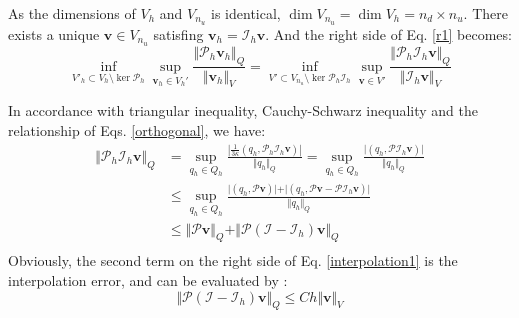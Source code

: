 \begin{pf}
    As the dimensions of $V_h$ and $V_{n_u}$ is identical, $\dim V_{n_u}=\dim V_h = n_d\times n_u$. There exists a unique $\boldsymbol v \in V_{n_u}$ satisfing $\boldsymbol v_h = \mathcal I_h \boldsymbol v$. And the right side of Eq. \eqref{r1} becomes:
\begin{equation}\label{r21}
\inf_{V'_h \subset V_h\setminus \ker \mathcal P_h}\sup_{\boldsymbol v_h \in V_h'} \frac{\Vert \mathcal P_h \boldsymbol v_h \Vert_Q}{\Vert \boldsymbol v_h \Vert_V} = 
\inf_{V'\subset V_{n_u}\setminus \ker \mathcal P_h \mathcal I_h}\sup_{\boldsymbol v \in V'} \frac{\Vert \mathcal P_h \mathcal I_h \boldsymbol v \Vert_Q}{\Vert \mathcal I_h \boldsymbol v \Vert_V}
\end{equation}

In accordance with triangular inequality, Cauchy-Schwarz inequality and the relationship of Eqs. \eqref{orthogonal}, we have:
\begin{equation}\label{interpolation1}
\begin{aligned}
    \Vert \mathcal P_h \mathcal I_h \boldsymbol v \Vert_Q &= 
    \sup_{q_h \in Q_h} \frac{\left \vert \frac{1}{3\kappa}(q_h, \mathcal P_h \mathcal I_h \boldsymbol v) \right \vert}{\Vert q_h \Vert_Q}
    =\sup_{q_h \in Q_h} \frac{\vert (q_h, \mathcal P \mathcal I_h \boldsymbol v) \vert}{\Vert q_h \Vert_Q} 
    \\
    &\le \sup_{q_h \in Q_h} \frac{\vert (q_h, \mathcal P \boldsymbol v)\vert + \vert (q_h, \mathcal P \boldsymbol v - \mathcal P \mathcal I_h \boldsymbol v) \vert}{\Vert q_h \Vert_Q} 
    \\
    &\le \Vert \mathcal P \boldsymbol v \Vert_Q
    + \Vert \mathcal P(\mathcal I - \mathcal I_h) \boldsymbol v \Vert_Q \\
\end{aligned}
\end{equation}
Obviously, the second term on the right side of Eq. \eqref{interpolation1} is the interpolation error, and can be evaluated by \cite{yosida1995}:
\begin{equation}
\label{interpolation2}
    \Vert \mathcal P(\mathcal I - \mathcal I_h) \boldsymbol v \Vert_Q \le Ch \Vert \boldsymbol v \Vert_{V} 
\end{equation}


\end{pf}
